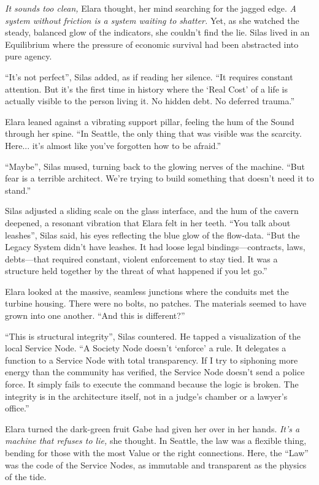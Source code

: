 \textit{It sounds too clean,} Elara thought, her mind searching for the jagged edge. \textit{A system without friction is a system waiting to shatter.} Yet, as she watched the steady, balanced glow of the indicators, she couldn't find the lie. Silas lived in an Equilibrium where the pressure of economic survival had been abstracted into pure agency.

``It's not perfect'', Silas added, as if reading her silence. ``It requires constant attention. But it's the first time in history where the `Real Cost' of a life is actually visible to the person living it. No hidden debt. No deferred trauma.''

Elara leaned against a vibrating support pillar, feeling the hum of the Sound through her spine. ``In Seattle, the only thing that was visible was the scarcity. Here... it's almost like you've forgotten how to be afraid.''

``Maybe'', Silas mused, turning back to the glowing nerves of the machine. ``But fear is a terrible architect. We're trying to build something that doesn't need it to stand.''

Silas adjusted a sliding scale on the glass interface, and the hum of the cavern deepened, a resonant vibration that Elara felt in her teeth. ``You talk about leashes'', Silas said, his eyes reflecting the blue glow of the flow-data. ``But the Legacy System didn't have leashes. It had loose legal bindings—contracts, laws, debts—that required constant, violent enforcement to stay tied. It was a structure held together by the threat of what happened if you let go.''

Elara looked at the massive, seamless junctions where the conduits met the turbine housing. There were no bolts, no patches. The materials seemed to have grown into one another. ``And this is different?''

``This is structural integrity'', Silas countered. He tapped a visualization of the local Service Node. ``A Society Node doesn't `enforce' a rule. It delegates a function to a Service Node with total transparency. If I try to siphoning more energy than the community has verified, the Service Node doesn't send a police force. It simply fails to execute the command because the logic is broken. The integrity is in the architecture itself, not in a judge's chamber or a lawyer's office.''

Elara turned the dark-green fruit Gabe had given her over in her hands. \textit{It’s a machine that refuses to lie,} she thought. In Seattle, the law was a flexible thing, bending for those with the most Value or the right connections. Here, the ``Law'' was the code of the Service Nodes, as immutable and transparent as the physics of the tide.

